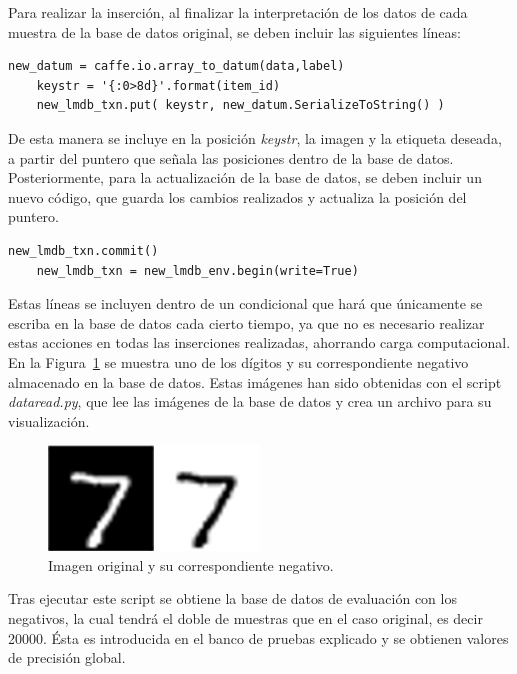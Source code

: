Para realizar la inserción, al finalizar la interpretación de los datos de cada muestra de la base de datos original, se deben incluir las siguientes líneas:
\vspace{10pt}
\begin{lstlisting}[frame=single]
	new_datum = caffe.io.array_to_datum(data,label)
	keystr = '{:0>8d}'.format(item_id)
	new_lmdb_txn.put( keystr, new_datum.SerializeToString() )
\end{lstlisting}
De esta manera se incluye en la posición \textit{keystr}, la imagen y la etiqueta deseada, a partir del puntero que señala las posiciones dentro de la base de datos.\\

Posteriormente, para la actualización de la base de datos, se deben incluir un nuevo código, que guarda los cambios realizados y actualiza la posición del puntero.
\vspace{10pt}
\begin{lstlisting}[frame=single]
	new_lmdb_txn.commit()
	new_lmdb_txn = new_lmdb_env.begin(write=True)
\end{lstlisting}
Estas líneas se incluyen dentro de un condicional que hará que únicamente se escriba en la base de datos cada cierto tiempo, ya que no es necesario realizar estas acciones en todas las inserciones realizadas, ahorrando carga computacional.\\

En la Figura~\ref{fig.neg} se muestra uno de los dígitos y su correspondiente negativo almacenado en la base de datos. Estas imágenes han sido obtenidas con el script \textit{dataread.py}, que lee las imágenes de la base de datos y crea un archivo para su visualización.\\

\begin{figure}[H]
	\begin{center}
		\includegraphics[width=0.5\textwidth]{figures/negativo}
		\caption{Imagen original y su correspondiente negativo.}
		\label{fig.neg}
	\end{center}
\end{figure}

Tras ejecutar este script se obtiene la base de datos de evaluación con los negativos, la cual tendrá el doble de muestras que en el caso original, es decir 20000. Ésta es introducida en el banco de pruebas explicado y se obtienen valores de precisión global.\\

